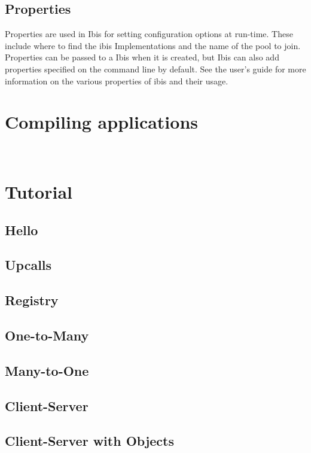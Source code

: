 \documentclass[10pt]{article}
\begin{document}
\subsection{Properties}

Properties are used in Ibis for setting configuration options at
run-time. These include where to find the ibis Implementations and the name
of the pool to join. Properties can be passed to a Ibis when it is
created, but Ibis can also add properties specified on the command line
by default. See the user's guide for more information on the various
properties of ibis and their usage.

\section{Compiling applications}\


\section{Tutorial}

\subsection{Hello}

\subsection{Upcalls}

\subsection{Registry}

\subsection{One-to-Many}

\subsection{Many-to-One}

\subsection{Client-Server}

\subsection{Client-Server with Objects}
\end{document}
